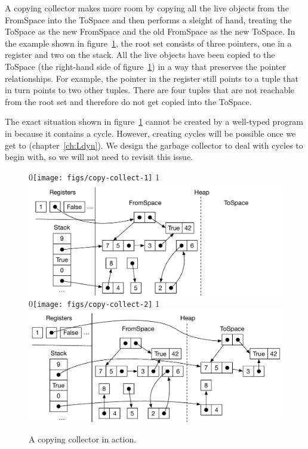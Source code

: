 \documentclass[7x10]{TimesAPriori_MIT}%
\def\racketEd{0}
\def\pythonEd{1}
\def\edition{1}
\newcommand{\racket}[1]{{\if\edition\racketEd{#1}\fi}}
\newcommand{\pythonColor}[0]{}
\newcommand{\python}[1]{{\if\edition\pythonEd\pythonColor #1\fi}}
\numberwithin{theorem}{chapter}
\numberwithin{definition}{chapter}
\numberwithin{equation}{chapter}
\begin{document}
A copying collector makes more room by copying all the live objects
from the FromSpace into the ToSpace and then performs a sleight of
hand, treating the ToSpace as the new FromSpace and the old FromSpace
as the new ToSpace.  In the example shown in
figure~\ref{fig:copying-collector}, the root set consists of three
pointers, one in a register and two on the stack. All the live
objects have been copied to the ToSpace (the right-hand side of
figure~\ref{fig:copying-collector}) in a way that preserves the
pointer relationships. For example, the pointer in the register still
points to a tuple that in turn points to two other tuples.  There are
four tuples that are not reachable from the root set and therefore do
not get copied into the ToSpace.

The exact situation shown in figure~\ref{fig:copying-collector} cannot be
created by a well-typed program in \LangVec{} because it contains a
cycle. However, creating cycles will be possible once we get to
\LangDyn{} (chapter~\ref{ch:Ldyn}).  We design the garbage collector
to deal with cycles to begin with, so we will not need to revisit this
issue.

\begin{figure}[tbp]
\centering
\begin{tcolorbox}[colback=white]
  \racket{\texttt{[image: figs/copy-collect-1]}}
\python{\includegraphics[width=\textwidth]{figs/copy-collect-1-python}}
\\[5ex]
\racket{\texttt{[image: figs/copy-collect-2]}}
\python{\includegraphics[width=\textwidth]{figs/copy-collect-2-python}}
\end{tcolorbox}

\caption{A copying collector in action.}
\label{fig:copying-collector}
\end{figure}
\end{document}
